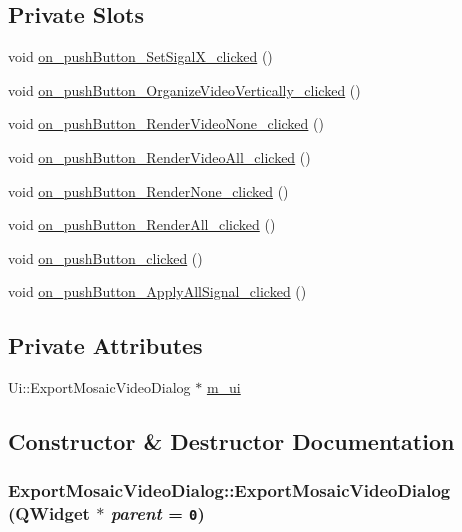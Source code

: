 \subsection*{Private Slots}
\begin{CompactItemize}
\item 
void \hyperlink{class_export_mosaic_video_dialog_35e21eb8cc6f392df51488a93c9e965d}{on\_\-pushButton\_\-SetSigalX\_\-clicked} ()
\item 
void \hyperlink{class_export_mosaic_video_dialog_b46ef42b32c21388abc835707dc12eab}{on\_\-pushButton\_\-OrganizeVideoVertically\_\-clicked} ()
\item 
void \hyperlink{class_export_mosaic_video_dialog_7d7a558b4012d128c2a528a19613286c}{on\_\-pushButton\_\-RenderVideoNone\_\-clicked} ()
\item 
void \hyperlink{class_export_mosaic_video_dialog_f1c305660c413aed1c3d657c63da142e}{on\_\-pushButton\_\-RenderVideoAll\_\-clicked} ()
\item 
void \hyperlink{class_export_mosaic_video_dialog_e822c4df173336186fe4cb7c3c2b7a05}{on\_\-pushButton\_\-RenderNone\_\-clicked} ()
\item 
void \hyperlink{class_export_mosaic_video_dialog_1e4b3629067107b7fab8b7120297b135}{on\_\-pushButton\_\-RenderAll\_\-clicked} ()
\item 
void \hyperlink{class_export_mosaic_video_dialog_30a0e8c70938885c365ef622e1a53ca0}{on\_\-pushButton\_\-clicked} ()
\item 
void \hyperlink{class_export_mosaic_video_dialog_ee8ffd4f42c57b9ef5519f468a421a8f}{on\_\-pushButton\_\-ApplyAllSignal\_\-clicked} ()
\end{CompactItemize}
\subsection*{Private Attributes}
\begin{CompactItemize}
\item 
Ui::ExportMosaicVideoDialog $\ast$ \hyperlink{class_export_mosaic_video_dialog_e7b48fe3d107daf366acf662a784b584}{m\_\-ui}
\end{CompactItemize}


\subsection{Constructor \& Destructor Documentation}
\hypertarget{class_export_mosaic_video_dialog_b82411d35d97e6685b3b5f21b9bcd7da}{
\subsubsection[{ExportMosaicVideoDialog}]{\setlength{\rightskip}{0pt plus 5cm}ExportMosaicVideoDialog::ExportMosaicVideoDialog (QWidget $\ast$ {\em parent} = {\tt 0})}}
\label{class_export_mosaic_video_dialog_b82411d35d97e6685b3b5f21b9bcd7da}


